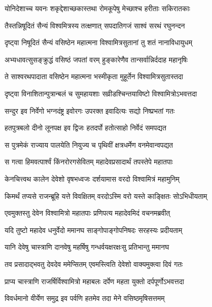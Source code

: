 \twolineshloka
{योनिदेशाच्च यवनः शकृद्देशाच्छकास्तथा}
{रोमकूपेषु मेच्छाश्च हरीताः सकिरातकाः} %

\twolineshloka
{तैस्तन्निषूदितं सैन्यं विश्वमित्रस्य तत्क्षणात्}
{सपदातिगजं साश्वं सरथं रघुनन्दन} %

\twolineshloka
{दृष्ट्वा निषूदितं सैन्यं वसिष्ठेन महात्मना}
{विश्वामित्रसुतानां तु शतं नानाविधायुधम्} %

\twolineshloka
{अभ्यधावत्सुसङ्क्रुद्धं वसिष्ठं जपतां वरम्}
{हुङ्कारेणैव तान्सर्वान्निर्ददाह महानृषिः} %

\twolineshloka
{ते साश्वरथपादाता वसिष्ठेन महात्मना}
{भस्मीकृता मुहूर्तेन विश्वामित्रसुतास्तदा} %

\twolineshloka
{दृष्ट्वा विनाशितान्पुत्रान्बलं च सुमहायशाः}
{सव्रीडश्चिन्तयाविष्टो विश्वामित्रोऽभवत्तदा} %

\twolineshloka
{सन्दुर इव निर्वेगो भग्नदंष्ट्र इवोरगः}
{उपरक्त इवादित्यः सद्यो निष्प्रभतां गतः} %

\twolineshloka
{हतपुत्रबलो दीनो लूनपक्ष इव द्विजः}
{हतदर्पो हतोत्साहो निर्वेदं समपद्यत} %

\twolineshloka
{स पुत्रमेकं राज्याय पालयेति नियुज्य च}
{पृथिवीं क्षत्रधर्मेण वनमेवान्वपद्यत} %

\twolineshloka
{स गत्वा हिमवत्पार्श्वं किंनरोरगसेवितम्}
{महादेवप्रसादार्थं तपस्तेपे महातपाः} %

\twolineshloka
{केनचित्त्वथ कालेन देवेशो वृषभध्वजः}
{दर्शयामास वरदो विश्वामित्रं महामुनिम्} %

\twolineshloka
{किमर्थं तप्यसे राजन्ब्रूहि यत्ते विवक्षितम्}
{वरदोऽस्मि वरो यस्ते काङ्क्षितः सोऽभिधीयताम्} %

\twolineshloka
{एवमुक्तस्तु देवेन विश्वामित्रो महातपाः}
{प्रणिपत्य महादेवमिदं वचनमब्रवीत्} %

\twolineshloka
{यदि तुष्टो महादेव धनुर्वेदो ममानघ}
{साङ्गोपाङ्गोपनिषदः सरहस्यः प्रदीयताम्} %

\twolineshloka
{यानि देवेषु चास्त्राणि दानवेषु महर्षिषु}
{गन्धर्वयक्षरक्षःसु प्रतिभान्तु ममानघ} %

\twolineshloka
{तव प्रसादाद्भवतु देवदेव ममेप्सितम्}
{एवमस्त्विति देवेशो वाक्यमुक्त्वा दिवं गतः} %

\twolineshloka
{प्राप्य चास्त्राणि राजर्षिर्विश्वामित्रो महाबलः}
{दर्पेण महता युक्तो दर्पपूर्णोऽभवत्तदा} %

\twolineshloka
{विवर्धमानो वीर्येण समुद्र इव पर्वणि}
{हतमेव तदा मेने वसिष्ठमृषिसत्तमम्} %

